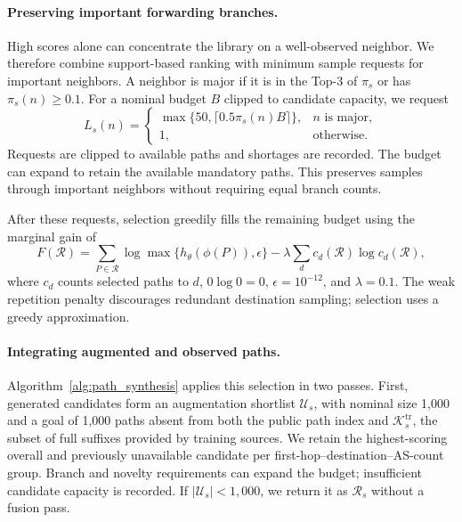 \paragraph{Preserving important forwarding branches.}
High scores alone can concentrate the library on a well-observed neighbor.
We therefore combine support-based ranking with minimum sample requests
for important neighbors. A neighbor is major if it is in the Top-3 of
$\pi_s$ or has $\pi_s(n)\geq0.1$. For a nominal budget $B$ clipped to candidate
capacity, we request
\begin{equation}
L_s(n)=
\begin{cases}
\max\{50,\lceil0.5\pi_s(n)B\rceil\},&n\text{ is major},\\
1,&\text{otherwise}.
\end{cases}
\label{eq:branch_floor}
\end{equation}
Requests are clipped to available paths and shortages are recorded. The
budget can expand to retain the available mandatory paths. This preserves
samples through important neighbors without requiring equal branch counts.

After these requests, selection greedily fills the remaining budget using
the marginal gain of
\begin{equation}
F(\mathcal R)=
\sum_{P\in\mathcal R}\log\max\{h_\theta(\phi(P)),\epsilon\}
-\lambda\sum_d c_d(\mathcal R)\log c_d(\mathcal R),
\label{eq:library_selection}
\end{equation}
where $c_d$ counts selected paths to $d$, $0\log0=0$, $\epsilon=10^{-12}$,
and $\lambda=0.1$. The weak repetition penalty discourages redundant
destination sampling; selection uses a greedy approximation.

\paragraph{Integrating augmented and observed paths.}
Algorithm~\ref{alg:path_synthesis} applies this selection in two passes.
First, generated candidates form an augmentation shortlist $\mathcal U_s$,
with nominal size 1,000 and a goal of 1,000 paths absent from both the public
path index and $\mathcal K_s^{\mathrm{tr}}$, the subset of full suffixes
provided by training sources. We retain the highest-scoring overall and
previously unavailable candidate per first-hop--destination--AS-count
group. Branch and novelty requirements can expand the budget; insufficient
candidate capacity is recorded. If $|\mathcal U_s|<1{,}000$, we return it as
$\mathcal R_s$ without a fusion pass.

